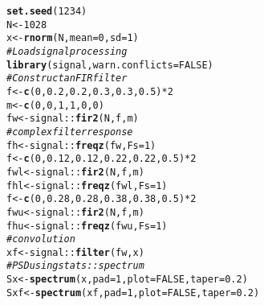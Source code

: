 \documentclass[10pt]{article}\usepackage[]{graphicx}\usepackage[]{color}
\makeatletter
\newcommand{\hlnum}[1]{\textcolor[rgb]{0.686,0.059,0.569}{#1}}%
\newcommand{\hlcom}[1]{\textcolor[rgb]{0.678,0.584,0.686}{\textit{#1}}}%
\newcommand{\hlopt}[1]{\textcolor[rgb]{0,0,0}{#1}}%
\newcommand{\hlstd}[1]{\textcolor[rgb]{0.345,0.345,0.345}{#1}}%
\newcommand{\hlkwb}[1]{\textcolor[rgb]{0.69,0.353,0.396}{#1}}%
\newcommand{\hlkwc}[1]{\textcolor[rgb]{0.333,0.667,0.333}{#1}}%
\newcommand{\hlkwd}[1]{\textcolor[rgb]{0.737,0.353,0.396}{\textbf{#1}}}%
\newenvironment{kframe}{%
 \def\at@end@of@kframe{}%
 \ifinner\ifhmode%
  \def\at@end@of@kframe{\end{minipage}}%
  \begin{minipage}{\columnwidth}%
 \fi\fi%
 \def\FrameCommand##1{\hskip\@totalleftmargin \hskip-\fboxsep
 \colorbox{shadecolor}{##1}\hskip-\fboxsep
     \hskip-\linewidth \hskip-\@totalleftmargin \hskip\columnwidth}%
 \MakeFramed {\advance\hsize-\width
   \@totalleftmargin\z@ \linewidth\hsize
   \@setminipage}}%
 {\par\unskip\endMakeFramed%
 \at@end@of@kframe}
\newenvironment{knitrout}{}{} %
\makeatother
\begin{document}
\begin{knitrout}
\color{fgcolor}\begin{kframe}
\begin{alltt}
\hlkwd{set.seed}\hlstd{(}\hlnum{1234}\hlstd{)}
\hlstd{N} \hlkwb{<-} \hlnum{1028}
\hlstd{x} \hlkwb{<-} \hlkwd{rnorm}\hlstd{(N,} \hlkwc{mean} \hlstd{=} \hlnum{0}\hlstd{,} \hlkwc{sd} \hlstd{=} \hlnum{1}\hlstd{)}
\hlcom{# Load signal processing}
\hlkwd{library}\hlstd{(signal,} \hlkwc{warn.conflicts}\hlstd{=}\hlnum{FALSE}\hlstd{)}
\hlcom{# Construct an FIR filter}
\hlstd{f} \hlkwb{<-} \hlkwd{c}\hlstd{(}\hlnum{0}\hlstd{,} \hlnum{0.2}\hlstd{,} \hlnum{0.2}\hlstd{,} \hlnum{0.3}\hlstd{,} \hlnum{0.3}\hlstd{,} \hlnum{0.5}\hlstd{)}\hlopt{*}\hlnum{2}
\hlstd{m} \hlkwb{<-} \hlkwd{c}\hlstd{(}\hlnum{0}\hlstd{,} \hlnum{0}\hlstd{,} \hlnum{1}\hlstd{,} \hlnum{1}\hlstd{,} \hlnum{0}\hlstd{,} \hlnum{0}\hlstd{)}
\hlstd{fw} \hlkwb{<-} \hlstd{signal}\hlopt{::}\hlkwd{fir2}\hlstd{(N, f, m)}
\hlcom{# complex filter response}
\hlstd{fh} \hlkwb{<-} \hlstd{signal}\hlopt{::}\hlkwd{freqz}\hlstd{(fw,} \hlkwc{Fs}\hlstd{=}\hlnum{1}\hlstd{)}
\hlstd{f} \hlkwb{<-} \hlkwd{c}\hlstd{(}\hlnum{0}\hlstd{,} \hlnum{0.12}\hlstd{,} \hlnum{0.12}\hlstd{,} \hlnum{0.22}\hlstd{,} \hlnum{0.22}\hlstd{,} \hlnum{0.5}\hlstd{)}\hlopt{*}\hlnum{2}
\hlstd{fwl} \hlkwb{<-} \hlstd{signal}\hlopt{::}\hlkwd{fir2}\hlstd{(N, f, m)}
\hlstd{fhl} \hlkwb{<-} \hlstd{signal}\hlopt{::}\hlkwd{freqz}\hlstd{(fwl,} \hlkwc{Fs}\hlstd{=}\hlnum{1}\hlstd{)}
\hlstd{f} \hlkwb{<-} \hlkwd{c}\hlstd{(}\hlnum{0}\hlstd{,} \hlnum{0.28}\hlstd{,} \hlnum{0.28}\hlstd{,} \hlnum{0.38}\hlstd{,} \hlnum{0.38}\hlstd{,} \hlnum{0.5}\hlstd{)}\hlopt{*}\hlnum{2}
\hlstd{fwu} \hlkwb{<-} \hlstd{signal}\hlopt{::}\hlkwd{fir2}\hlstd{(N, f, m)}
\hlstd{fhu} \hlkwb{<-} \hlstd{signal}\hlopt{::}\hlkwd{freqz}\hlstd{(fwu,} \hlkwc{Fs}\hlstd{=}\hlnum{1}\hlstd{)}
\hlcom{# convolution}
\hlstd{xf} \hlkwb{<-} \hlstd{signal}\hlopt{::}\hlkwd{filter}\hlstd{(fw, x)}
\hlcom{# PSD using stats::spectrum}
\hlstd{Sx} \hlkwb{<-} \hlkwd{spectrum}\hlstd{(x,} \hlkwc{pad}\hlstd{=}\hlnum{1}\hlstd{,} \hlkwc{plot}\hlstd{=}\hlnum{FALSE}\hlstd{,} \hlkwc{taper}\hlstd{=}\hlnum{0.2}\hlstd{)}
\hlstd{Sxf} \hlkwb{<-} \hlkwd{spectrum}\hlstd{(xf,} \hlkwc{pad}\hlstd{=}\hlnum{1}\hlstd{,} \hlkwc{plot}\hlstd{=}\hlnum{FALSE}\hlstd{,} \hlkwc{taper}\hlstd{=}\hlnum{0.2}\hlstd{)}
\end{alltt}
\end{kframe}
\end{knitrout}
%
\end{document}
